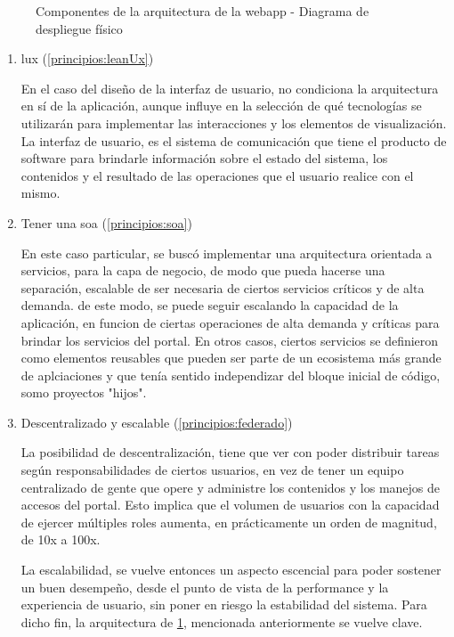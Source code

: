 \begin{figure} [h!]
\begin{tikzpicture} [node distance=1.8cm and 2.5cm]
\end{tikzpicture}
    \caption{Componentes de la arquitectura de la webapp - Diagrama de despliegue físico}
    \label{fig:arq_webapp} 
\end{figure}

\newpage

\begin{enumerate}

    \item \Gls{lux} (\ref{principios:leanUx})

    En el caso del diseño de la interfaz de usuario, no condiciona la arquitectura en sí de la aplicación, aunque influye en la selección de qué tecnologías se utilizarán para implementar las interacciones y los elementos de visualización. La interfaz de usuario, es el sistema de comunicación que tiene el producto de software para brindarle información sobre el estado del sistema, los contenidos y el resultado de las operaciones que el usuario realice con el mismo. 
    
    \item Tener una \gls{soa} (\ref{principios:soa})

    En este caso particular, se buscó implementar una arquitectura orientada a servicios, para la capa de negocio, de modo que pueda hacerse una separación, escalable de ser necesaria de ciertos servicios críticos y de alta demanda. de este modo, se puede seguir escalando la capacidad de la aplicación, en funcion de ciertas operaciones de alta demanda y críticas para brindar los servicios del portal. En otros casos, ciertos servicios se definieron como elementos reusables que pueden ser parte de un ecosistema más grande de aplciaciones y que tenía sentido independizar del bloque inicial de código, somo proyectos "hijos".
    
    \item Descentralizado y escalable (\ref{principios:federado})
    
    La posibilidad de descentralización, tiene que ver con poder distribuir tareas según responsabilidades de ciertos usuarios, en vez de tener un equipo centralizado de gente que opere y administre los contenidos y los manejos de accesos del portal. Esto implica que el volumen de usuarios con la capacidad de ejercer múltiples roles aumenta, en prácticamente un orden de magnitud, de 10x a 100x.
    
    La escalabilidad, se vuelve entonces un aspecto escencial para poder sostener un buen desempeño, desde el punto de vista de la performance y la experiencia de usuario, sin poner en riesgo la estabilidad del sistema. Para dicho fin, la arquitectura de \ref{fig:arq_webapp}, mencionada anteriormente se vuelve clave.
    

\end{enumerate}
